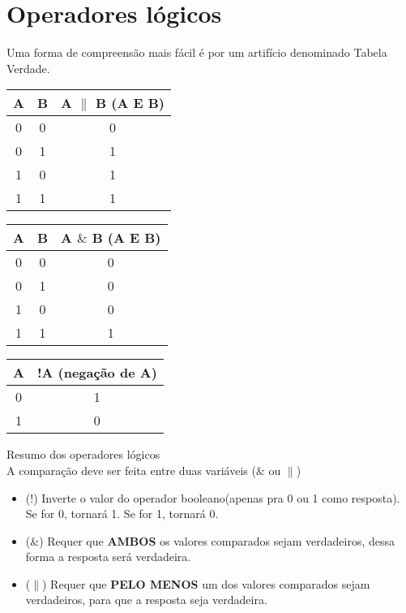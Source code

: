 \documentclass[12pt]{article}
\begin{document}
\section{Operadores lógicos}
Uma forma de compreensão mais fácil é por um artifício denominado Tabela Verdade.

\centering
\begin{tabular}{|c|c|c|}
	\hline
	A & B & A $\|$ B (A E B) \\
	\hline
	0 & 0 & 0 \\
	\hline
	0 & 1 & 1 \\
	\hline
	1 & 0 & 1 \\
	\hline
	1 & 1 & 1 \\
	\hline
	
\end{tabular}

\centering
\begin{tabular}{|c|c|c|}
	\hline
	A & B & A $\&$ B (A E B) \\
	\hline
	0 & 0 & 0 \\
	\hline
	0 & 1 & 0 \\
	\hline
	1 & 0 & 0 \\
	\hline
	1 & 1 & 1 \\
	\hline
	
\end{tabular}

\centering
\begin{tabular}{|c|c|}
	\hline
	A & !A (negação de A) \\
	\hline
	0 & 1 \\
	\hline
	1 & 0 \\
	\hline
\end{tabular}
\newpage

Resumo dos operadores lógicos\\

A comparação deve ser feita entre duas variáveis ($\&$ ou $\|$)
\begin{itemize}
    \item (!) Inverte o valor do operador booleano(apenas pra 0 ou 1 como resposta). Se for 0, tornará 1. Se for 1, tornará 0.
    \item ($\&$) Requer que \textbf{AMBOS} os valores comparados sejam verdadeiros, dessa forma a resposta será verdadeira.
    \item ($\|$) Requer que \textbf{PELO MENOS} um dos valores comparados sejam verdadeiros, para que a resposta seja verdadeira.
\end{itemize}
\end{document}

